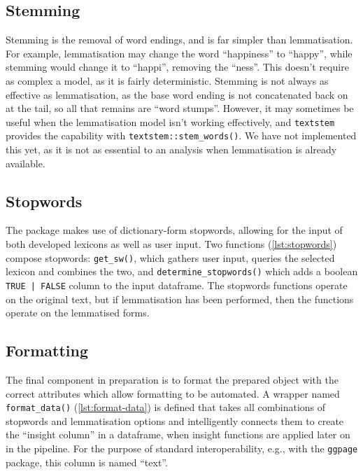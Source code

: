 \documentclass[11pt, a4paper, titlepage]{report}
\begin{document}
\subsection{Stemming}

Stemming is the removal of word endings, and is far simpler than
lemmatisation. For example, lemmatisation may change the word
``happiness'' to ``happy'', while stemming would change it to
``happi'', removing the ``ness''. This doesn't require as complex a
model, as it is fairly deterministic. Stemming is not always as
effective as lemmatisation, as the base word ending is not
concatenated back on at the tail, so all that remains are ``word
stumps''. However, it may sometimes be useful when the lemmatisation
model isn't working effectively, and \texttt{textstem} provides the
capability with \texttt{textstem::stem_words()}. We have not
implemented this yet, as it is not as essential to an analysis when
lemmatisation is already available.

\subsection{Stopwords}\label{sec:stopwords}

The package makes use of dictionary-form stopwords, allowing for the
input of both developed lexicons as well as user input. Two functions
(\underline{\cref{lst:stopwords}}) compose stopwords:
\texttt{get_sw()}, which gathers user input, queries the
selected lexicon and combines the two, and
\texttt{determine_stopwords()} which adds a boolean
\texttt{TRUE | FALSE} column to the input dataframe. The
stopwords functions operate on the original text, but if lemmatisation
has been performed, then the functions operate on the lemmatised
forms.

\subsection{Formatting}\label{sec:formatting}

The final component in preparation is to format the prepared object
with the correct attributes which allow formatting to be automated. A
wrapper named \texttt{format_data()}
(\underline{\cref{lst:format-data}}) is defined that takes all
combinations of stopwords and lemmatisation options and intelligently
connects them to create the ``insight column'' in a dataframe, when
insight functions are applied later on in the pipeline. For the
purpose of standard interoperability, e.g., with the \texttt{ggpage} package,
this column is named ``text''.
\end{document}
